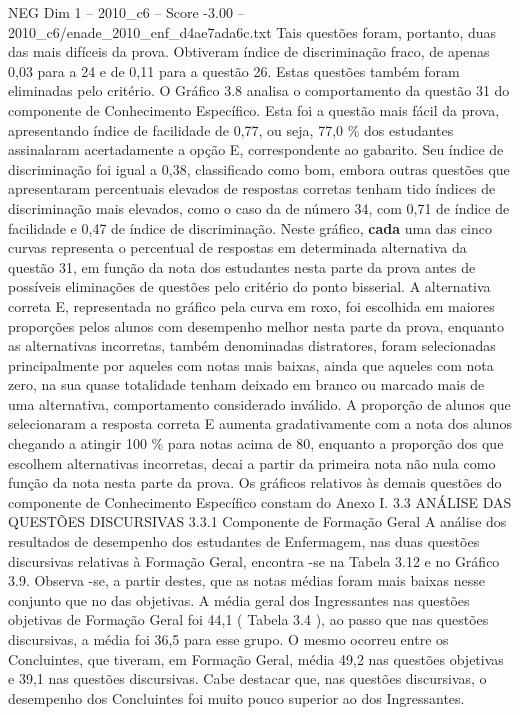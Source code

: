 \begin{textsample}{NEG Dim 1 – 2010\_c6 – Score -3.00 – 2010\_c6/enade\_2010\_enf\_d4ae7ada6c.txt}
Tais questões foram, portanto, duas das mais difíceis da prova.
Obtiveram índice de discriminação fraco, de apenas 0,03 para a 24 e de 0,11 para a questão 26.
Estas questões também foram eliminadas pelo critério.
O Gráfico 3.8 analisa o comportamento da questão 31 do componente de Conhecimento Específico.
Esta foi a questão mais fácil da prova, apresentando índice de facilidade de 0,77, ou seja, 77,0 \% dos estudantes assinalaram acertadamente a opção E, correspondente ao gabarito.
Seu índice de discriminação foi igual a 0,38, classificado como bom, embora outras questões que apresentaram percentuais elevados de respostas corretas tenham tido índices de discriminação mais elevados, como o caso da de número 34, com 0,71 de índice de facilidade e 0,47 de índice de discriminação.
Neste gráfico, \textbf{cada} uma das cinco curvas representa o percentual de respostas em determinada alternativa da questão 31, em função da nota dos estudantes nesta parte da prova antes de possíveis eliminações de questões pelo critério do ponto bisserial.
A alternativa correta E, representada no gráfico pela curva em roxo, foi escolhida em maiores proporções pelos alunos com desempenho melhor nesta parte da prova, enquanto as alternativas incorretas, também denominadas distratores, foram selecionadas principalmente por aqueles com notas mais baixas, ainda que aqueles com nota zero, na sua quase totalidade tenham deixado em branco ou marcado mais de uma alternativa, comportamento considerado inválido.
A proporção de alunos que selecionaram a resposta correta E aumenta gradativamente com a nota dos alunos chegando a atingir 100 \% para notas acima de 80, enquanto a proporção dos que escolhem alternativas incorretas, decai a partir da primeira nota não nula como função da nota nesta parte da prova.
Os gráficos relativos às demais questões do componente de Conhecimento Específico constam do Anexo I. 3.3 ANÁLISE DAS QUESTÕES DISCURSIVAS 3.3.1 Componente de Formação Geral A análise dos resultados de desempenho dos estudantes de Enfermagem, nas duas questões discursivas relativas à Formação Geral, encontra -se na Tabela 3.12 e no Gráfico 3.9.
Observa -se, a partir destes, que as notas médias foram mais baixas nesse conjunto que no das objetivas.
A média geral dos Ingressantes nas questões objetivas de Formação Geral foi 44,1 ( Tabela 3.4 ), ao passo que nas questões discursivas, a média foi 36,5 para esse grupo.
O mesmo ocorreu entre os Concluintes, que tiveram, em Formação Geral, média 49,2 nas questões objetivas e 39,1 nas questões discursivas.
Cabe destacar que, nas questões discursivas, o desempenho dos Concluintes foi muito pouco superior ao dos Ingressantes.

\end{textsample}
